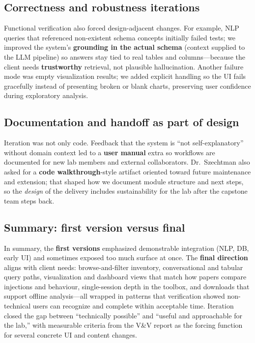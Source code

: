 \documentclass{article}
\begin{document}
\subsection{Correctness and robustness iterations}

\par{Functional verification also forced design-adjacent changes. For example, NLP queries that referenced non-existent schema concepts initially failed tests; we improved the system's \textbf{grounding in the actual schema} (context supplied to the LLM pipeline) so answers stay tied to real tables and columns---because the client needs \textbf{trustworthy} retrieval, not plausible hallucination. Another failure mode was empty visualization results; we added explicit handling so the UI fails gracefully instead of presenting broken or blank charts, preserving user confidence during exploratory analysis.}

\subsection{Documentation and handoff as part of design}

\par{Iteration was not only code. Feedback that the system is ``not self-explanatory'' without domain context led to a \textbf{user manual} extra so workflows are documented for new lab members and external collaborators. Dr.~Szechtman also asked for a \textbf{code walkthrough}-style artifact oriented toward future maintenance and extension; that shaped how we document module structure and next steps, so the \emph{design} of the delivery includes sustainability for the lab after the capstone team steps back.}

\subsection{Summary: first version versus final}

\par{In summary, the \textbf{first versions} emphasized demonstrable integration (NLP, DB, early UI) and sometimes exposed too much surface at once. The \textbf{final direction} aligns with client needs: browse-and-filter inventory, conversational and tabular query paths, visualization and dashboard views that match how papers compare injections and behaviour, single-session depth in the toolbox, and downloads that support offline analysis---all wrapped in patterns that verification showed non-technical users can recognize and complete within acceptable time. Iteration closed the gap between ``technically possible'' and ``useful and approachable for the lab,'' with measurable criteria from the V\&V report as the forcing function for several concrete UI and content changes.}
\end{document}
